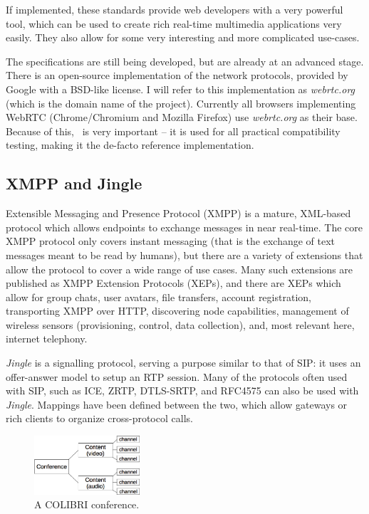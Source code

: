 \documentclass[twoside,openright,a4paper,11pt,english]{article}
\begin{document}
If implemented, these standards provide web developers with a very powerful tool, which
can be used to create rich real-time multimedia applications very easily. They
also allow for some very interesting and more complicated use-cases.

The specifications are still being developed, but are already at an advanced stage. There is
an open-source implementation of the network protocols, provided by Google with
a BSD-like license. I will refer to this implementation as \emph{webrtc.org}
(which is the domain name of the project). Currently all browsers implementing
WebRTC (Chrome/Chromium and Mozilla Firefox) 
use \emph{webrtc.org} as their base. Because of this, \wrtc\ is very important -- it is
used for all practical compatibility testing, making it the de-facto reference implementation.




\subsection{XMPP and Jingle}
Extensible Messaging and Presence Protocol (XMPP)\cite{rfc6120} is a mature,
XML-based protocol which allows endpoints
to exchange messages in near real-time. The core XMPP protocol only covers instant messaging (that is the exchange of
text messages meant to be read by humans), but there are a variety of extensions that allow the protocol
to cover a wide range of use cases. Many such extensions are published as XMPP Extension Protocols (XEPs), and there are XEPs which allow for
group chats, user avatars, file transfers, account registration, transporting
XMPP over HTTP, discovering node capabilities, management of  wireless sensors (provisioning, control, data collection),
and, most relevant here, internet telephony.

\emph{Jingle}\cite{jingle166, jingle167} 
is a signalling protocol, serving a purpose similar to that of SIP: it uses an
offer-answer model to setup an RTP session. Many of the
protocols often used with SIP, such as ICE\cite{ice}, ZRTP, DTLS-SRTP, and
RFC4575 can also be used with \emph{Jingle}. Mappings
have been defined between the two\cite{stoxmedia}, which allow gateways or rich
clients to organize cross-protocol calls.

\begin{figure}
   \centering
        \includegraphics[width=0.35\textwidth]{./pics/colibri-conf.eps}
        \caption{A COLIBRI conference.}
   \label{colibri-conf}
\end{figure}
\end{document}

